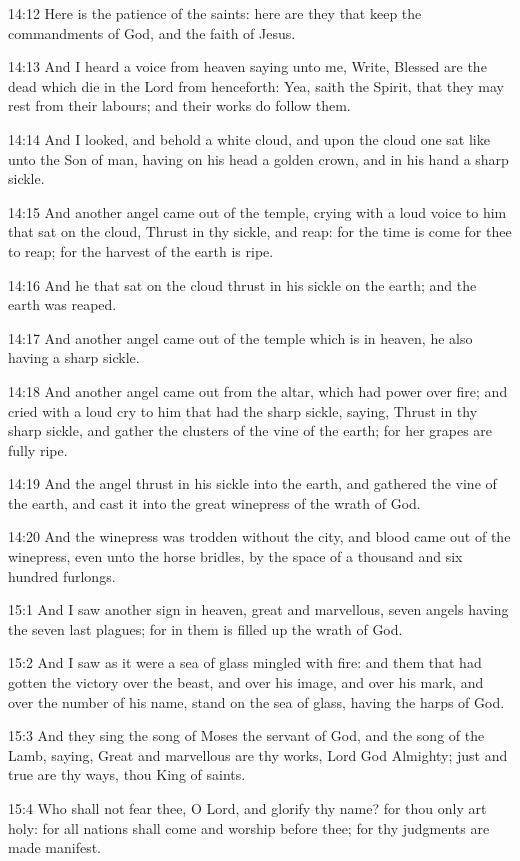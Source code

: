 14:12 Here is the patience of the saints: here are they that keep the
commandments of God, and the faith of Jesus.

14:13 And I heard a voice from heaven saying unto me, Write, Blessed
are the dead which die in the Lord from henceforth: Yea, saith the
Spirit, that they may rest from their labours; and their works do
follow them.

14:14 And I looked, and behold a white cloud, and upon the cloud one
sat like unto the Son of man, having on his head a golden crown, and
in his hand a sharp sickle.

14:15 And another angel came out of the temple, crying with a loud
voice to him that sat on the cloud, Thrust in thy sickle, and reap:
for the time is come for thee to reap; for the harvest of the earth is
ripe.

14:16 And he that sat on the cloud thrust in his sickle on the earth;
and the earth was reaped.

14:17 And another angel came out of the temple which is in heaven, he
also having a sharp sickle.

14:18 And another angel came out from the altar, which had power over
fire; and cried with a loud cry to him that had the sharp sickle,
saying, Thrust in thy sharp sickle, and gather the clusters of the
vine of the earth; for her grapes are fully ripe.

14:19 And the angel thrust in his sickle into the earth, and gathered
the vine of the earth, and cast it into the great winepress of the
wrath of God.

14:20 And the winepress was trodden without the city, and blood came
out of the winepress, even unto the horse bridles, by the space of a
thousand and six hundred furlongs.

15:1 And I saw another sign in heaven, great and marvellous, seven
angels having the seven last plagues; for in them is filled up the
wrath of God.

15:2 And I saw as it were a sea of glass mingled with fire: and them
that had gotten the victory over the beast, and over his image, and
over his mark, and over the number of his name, stand on the sea of
glass, having the harps of God.

15:3 And they sing the song of Moses the servant of God, and the song
of the Lamb, saying, Great and marvellous are thy works, Lord God
Almighty; just and true are thy ways, thou King of saints.

15:4 Who shall not fear thee, O Lord, and glorify thy name? for thou
only art holy: for all nations shall come and worship before thee; for
thy judgments are made manifest.

